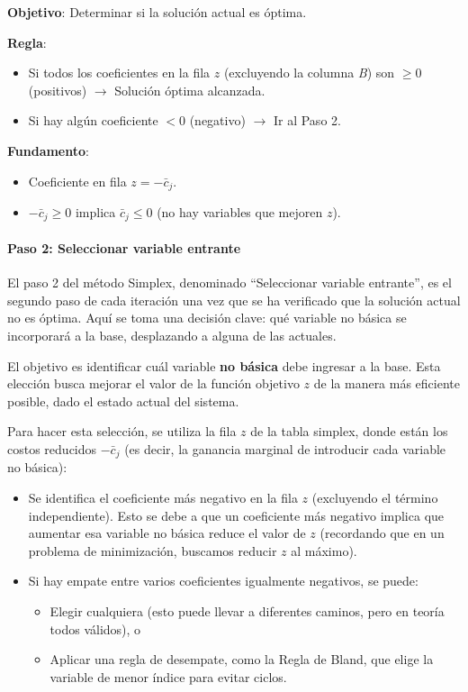 \begin{tcolorbox}[title=Resumen del paso 1]
  \noindent \textbf{Objetivo}: Determinar si la solución actual es óptima.

  \noindent \textbf{Regla}:
  \begin{itemize}
    \item Si todos los coeficientes en la fila \(z\) (excluyendo la columna \textit{B}) son \(\geq 0\) (positivos) \(\rightarrow\) Solución óptima alcanzada.
    \item Si hay algún coeficiente \(< 0\) (negativo) \(\rightarrow\) Ir al Paso 2.
  \end{itemize}

  \noindent \textbf{Fundamento}:
  \begin{itemize}
    \item Coeficiente en fila \(z = -\bar{c}_j\).
    \item \(-\bar{c}_j \geq 0\) implica \(\bar{c}_j \leq 0\) (no hay variables que mejoren \(z\)).
  \end{itemize}
\end{tcolorbox}

\paragraph{Paso 2: Seleccionar variable entrante}

El paso 2 del método Simplex, denominado ``Seleccionar variable entrante'', es el segundo paso de cada iteración una vez que se ha verificado que la solución actual no es óptima. Aquí se toma una decisión clave: qué variable no básica se incorporará a la base, desplazando a alguna de las actuales.

El objetivo es identificar cuál variable \textbf{no básica} debe ingresar a la base. Esta elección busca mejorar el valor de la función objetivo \(z\) de la manera más eficiente posible, dado el estado actual del sistema.

Para hacer esta selección, se utiliza la fila \(z\) de la tabla simplex, donde están los costos reducidos \(-\bar{c}_j\) (es decir, la ganancia marginal de introducir cada variable no básica):
\begin{itemize}
  \item Se identifica el coeficiente más negativo en la fila \(z\) (excluyendo el término independiente). Esto se debe a que un coeficiente más negativo implica que aumentar esa variable no básica reduce el valor de \(z\) (recordando que en un problema de minimización, buscamos reducir \(z\) al máximo).
  \item Si hay empate entre varios coeficientes igualmente negativos, se puede:
  \begin{itemize}
    \item Elegir cualquiera (esto puede llevar a diferentes caminos, pero en teoría todos válidos), o
    \item Aplicar una regla de desempate, como la Regla de Bland, que elige la variable de menor índice para evitar ciclos.
  \end{itemize}
\end{itemize}

